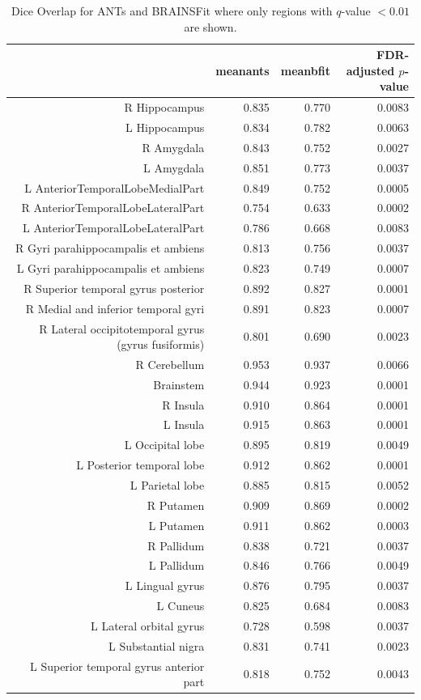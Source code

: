 \documentclass{frontiersSCNS}
\begin{document}
\begin{table}[ht]
\begin{tiny}
\centering
\begin{tabular}{rrrr}
  \hline
 & meanants & meanbfit & FDR-adjusted $p$-value \\ 
  \hline
R Hippocampus & 0.835 & 0.770 & 0.0083 \\ 
  L Hippocampus & 0.834 & 0.782 & 0.0063 \\ 
  R Amygdala & 0.843 & 0.752 & 0.0027 \\ 
  L Amygdala & 0.851 & 0.773 & 0.0037 \\ 
  L AnteriorTemporalLobeMedialPart & 0.849 & 0.752 & 0.0005 \\ 
  R AnteriorTemporalLobeLateralPart & 0.754 & 0.633 & 0.0002 \\ 
  L AnteriorTemporalLobeLateralPart & 0.786 & 0.668 & 0.0083 \\ 
  R Gyri parahippocampalis et ambiens & 0.813 & 0.756 & 0.0037 \\ 
  L Gyri parahippocampalis et ambiens & 0.823 & 0.749 & 0.0007 \\ 
  R Superior temporal gyrus posterior & 0.892 & 0.827 & 0.0001 \\ 
  R Medial and inferior temporal gyri & 0.891 & 0.823 & 0.0007 \\ 
  R Lateral occipitotemporal gyrus (gyrus fusiformis) & 0.801 & 0.690 & 0.0023 \\ 
  R Cerebellum & 0.953 & 0.937 & 0.0066 \\ 
  Brainstem & 0.944 & 0.923 & 0.0001 \\ 
  R Insula & 0.910 & 0.864 & 0.0001 \\ 
  L Insula & 0.915 & 0.863 & 0.0001 \\ 
  L Occipital lobe & 0.895 & 0.819 & 0.0049 \\ 
  L Posterior temporal lobe & 0.912 & 0.862 & 0.0001 \\ 
  L Parietal lobe & 0.885 & 0.815 & 0.0052 \\ 
  R Putamen & 0.909 & 0.869 & 0.0002 \\ 
  L Putamen & 0.911 & 0.862 & 0.0003 \\ 
  R Pallidum & 0.838 & 0.721 & 0.0037 \\ 
  L Pallidum & 0.846 & 0.766 & 0.0049 \\ 
  L Lingual gyrus & 0.876 & 0.795 & 0.0037 \\ 
  L Cuneus & 0.825 & 0.684 & 0.0083 \\ 
  L Lateral orbital gyrus & 0.728 & 0.598 & 0.0037 \\ 
  L Substantial nigra & 0.831 & 0.741 & 0.0023 \\ 
  L Superior temporal gyrus anterior part & 0.818 & 0.752 & 0.0043 \\ 
   \hline
\end{tabular}
\caption{Dice Overlap for ANTs and BRAINSFit where only regions with
  $q$-value $<0.01$ are shown.\label{tbl:tbl}} 
\end{tiny}
\end{table}
\end{document}
